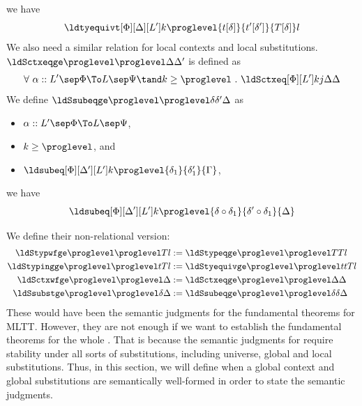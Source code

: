 we have
\[
  \ldtyequivt[\Phi][\Delta][L'] k \proglevel{t[\delta]}{t'[\delta']}{T[\delta]} l
\] %
We also need a similar relation for local contexts and local substitutions. %
$\ldSctxeqge \proglevel \proglevel \Delta{\Delta'}$ is defined as
\[
  \forall ~ \alpha :: L' \sep \Phi \To L \sep \Psi \tand k \ge \proglevel ~.~ \ldSctxeq[\Phi][L'] k j{\Delta}{\Delta}
\]
We define $\ldSsubeqge \proglevel \proglevel \delta{\delta'}\Delta$ as 
\begin{itemize}
\item $\alpha :: L' \sep \Phi \To L \sep \Psi$, 
\item $k \ge \proglevel$, and
\item $\ldsubeq[\Phi][\Delta'][L'] k \proglevel{\delta_1}{\delta_1'}{\Gamma}$,
\end{itemize}
we have
\[
  \ldsubeq[\Phi][\Delta'][L'] k \proglevel{\delta \circ \delta_1}{\delta' \circ \delta_1}{\Delta}
\] %

We define their non-relational version:
\begin{align*}
  \ldStypwfge \proglevel \proglevel T l &:= \ldStypeqge \proglevel \proglevel T{T} l \\
  \ldStypingge \proglevel \proglevel t T l &:= \ldStyequivge \proglevel \proglevel t{t} T l \\
  \ldSctxwfge \proglevel \proglevel \Delta &:= \ldSctxeqge \proglevel \proglevel \Delta{\Delta} \\
  \ldSsubstge \proglevel \proglevel \delta \Delta &:= \ldSsubeqge \proglevel \proglevel \delta\delta \Delta
\end{align*}
These would have been the semantic judgments for the fundamental theorems for MLTT. %
However, they are not enough if we want to establish the fundamental theorems for the
whole \delamlang. %
That is because the semantic judgments for \delamlang require stability under all
sorts of substitutions, including universe, global and local substitutions. %
Thus, in this section, we will define when a global context and global
substitutions are semantically well-formed in order to state the semantic judgments. %


